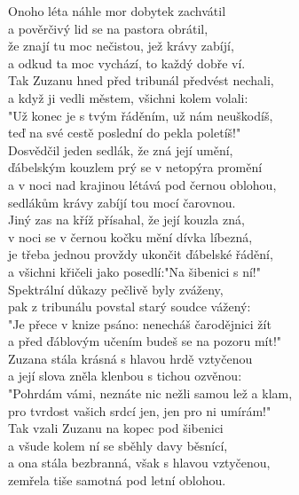 \begin{large}

Onoho léta náhle mor dobytek zachvátil\\
a pověrčivý lid se na pastora obrátil,\\
že znají tu moc nečistou, jež krávy zabíjí,\\
a odkud ta moc vychází, to každý dobře ví.\\

Tak Zuzanu hned před tribunál předvést nechali,\\
a když ji vedli městem, všichni kolem volali:\\
"Už konec je s tvým řáděním, už nám neuškodíš,\\
teď na své cestě poslední do pekla poletíš!"\\

Dosvědčil jeden sedlák, že zná její umění,\\
ďábelským kouzlem prý se v netopýra promění\\
a v noci nad krajinou létává pod černou oblohou,\\
sedlákům krávy zabíjí tou mocí čarovnou.\\

Jiný zas na kříž přísahal, že její kouzla zná,\\
v noci se v černou kočku mění dívka líbezná,\\
je třeba jednou provždy ukončit ďábelské řádění,\\
a všichni křičeli jako posedlí:"Na šibenici s ní!"\\

Spektrální důkazy pečlivě byly zváženy,\\
pak z tribunálu povstal starý soudce vážený:\\
"Je přece v knize psáno: nenecháš čarodějnici žít\\
a před ďáblovým učením budeš se na pozoru mít!"\\

Zuzana stála krásná s hlavou hrdě vztyčenou\\
a její slova zněla klenbou s tichou ozvěnou:\\
"Pohrdám vámi, neznáte nic nežli samou lež a klam,\\
pro tvrdost vašich srdcí jen, jen pro ni umírám!"\\

Tak vzali Zuzanu na kopec pod šibenici\\
a všude kolem ní se sběhly davy běsnící,\\
a ona stála bezbranná, však s hlavou vztyčenou,\\
zemřela tiše samotná pod letní oblohou.

\end{large}

\newpage
